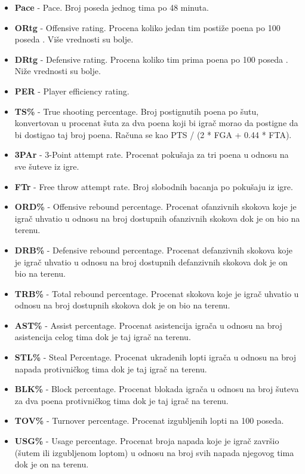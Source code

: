 \documentclass[a4paper]{article}
\begin{document}
\begin{itemize}
	\item \textbf{Pace} - Pace. Broj poseda jednog tima po 48 minuta.
	\item \textbf{ORtg} - Offensive rating. Procena koliko jedan tim postiže poena po 100 poseda \cite{odrt}. Više vrednosti su bolje.
	\item \textbf{DRtg} - Defensive rating. Procena koliko tim prima poena po 100 poseda \cite{odrt}. Niže vrednosti su bolje.
	\item \textbf{PER} - Player efficiency rating. \cite{per}
	\item \textbf{TS\%} - True shooting percentage. Broj postignutih poena po šutu, konvertovan u procenat šuta za dva poena koji bi igrač morao da postigne da bi dostigao taj broj poena. Računa se kao PTS / (2 * FGA + 0.44 * FTA). 
	\item \textbf{3PAr} - 3-Point attempt rate. Procenat pokušaja za tri poena u odnosu na sve šuteve iz igre.
	\item \textbf{FTr} - Free throw attempt rate. Broj slobodnih bacanja po pokušaju iz igre.
	\item \textbf{ORD\%} - Offensive rebound percentage. Procenat ofanzivnih skokova koje je igrač uhvatio u odnosu na broj dostupnih ofanzivnih skokova dok je on bio na terenu.
	\item \textbf{DRB\%} - Defensive rebound percentage. Procenat defanzivnih skokova koje je igrač uhvatio u odnosu na broj dostupnih defanzivnih skokova dok je on bio na terenu.
	\item \textbf{TRB\%} - Total rebound percentage. Procenat skokova koje je igrač uhvatio u odnosu na broj dostupnih skokova dok je on bio na terenu.
	\item \textbf{AST\%} - Assist percentage. Procenat asistencija igrača u odnosu na broj asistencija celog tima dok je taj igrač na terenu.
	\item \textbf{STL\%} - Steal Percentage. Procenat ukradenih lopti igrača u odnosu na broj napada protivničkog tima dok je taj igrač na terenu.
	\item \textbf{BLK\%} - Block percentage. Procenat blokada igrača u odnosu na broj šuteva za dva poena protivničkog tima dok je taj igrač na terenu.
	\item \textbf{TOV\%} - Turnover percentage. Procenat izgubljenih lopti na 100 poseda.
	\item \textbf{USG\%} - Usage percentage. Procenat broja napada koje je igrač završio (šutem ili izgubljenom loptom) u odnosu na broj svih napada njegovog tima dok je on na terenu.

\end{itemize}
\end{document}
